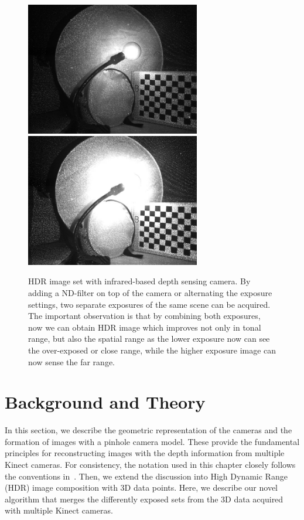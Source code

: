 \begin{figure}
\centering
\includegraphics[width=3.0in]{ch4/diagrams/low_expo_light.jpg} 
\includegraphics[width=3.0in]{ch4/diagrams/high_expo_light.jpg} \\
\caption{HDR image set with infrared-based depth sensing camera. By adding a ND-filter on top of 
the camera or alternating the exposure settings, two separate exposures of the same scene can be 
acquired. The important observation is that by combining both exposures, now we can obtain HDR 
image which improves not only in tonal range, but also the spatial range as the lower exposure 
now can see the over-exposed or close range, while the higher exposure image can now sense the 
far range.}
\label{fig:ir_hdr}
\end{figure}

\section{Background and Theory}
In this section, we describe the geometric representation of the cameras and the formation of 
images with a pinhole camera model. These provide the fundamental principles for reconstructing 
images with the depth information from multiple Kinect cameras.  For consistency, the notation 
used in this chapter closely follows the conventions in~\cite{wei1994implicit,zhang2000flexible}. 
Then, we extend the discussion into High Dynamic Range (HDR) image composition with 3D data 
points. Here, we describe our novel algorithm that merges the differently exposed sets from the 3D 
data acquired with multiple Kinect cameras.

